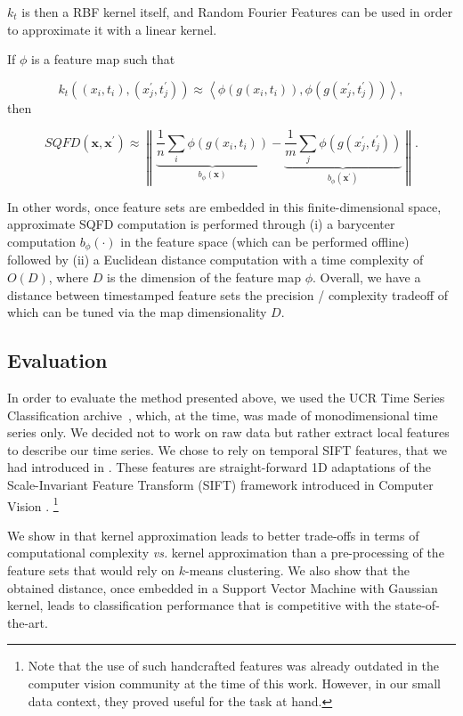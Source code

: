 $k_t$ is then a RBF kernel itself, and
Random Fourier Features \cite{NIPS2007_3182} can be
used in order to approximate it with a linear kernel.

If $\phi$ is a feature map such that

\begin{equation}
k_t((x_{i}, t_i), (x^\prime_j, t^\prime_j)) \approx
    \left\langle\phi(g(x_{i}, t_i)),
        \phi(g(x^\prime_{j}, t^\prime_j))\right\rangle,
\end{equation}
then

\begin{equation}
SQFD(\mathbf{x}, \mathbf{x}^\prime) \approx \left\|
    \underbrace{\frac{1}{n}\sum_i \phi(g(x_{i}, t_i))}_{b_\phi(\mathbf{x})} -
    \underbrace{\frac{1}{m}\sum_j
        \phi(g(x^\prime_{j}, t^\prime_j))}_{b_\phi(\mathbf{x}^\prime)}
    \right\|.
\end{equation}

In other words, once feature sets are embedded in this finite-dimensional
space, approximate SQFD computation is performed through (i) a barycenter
computation $b_\phi(\cdot)$ in the feature space (which can be performed
offline)
followed by (ii) a Euclidean distance computation with a time complexity of
$O(D)$, where $D$ is
the dimension of the feature map $\phi$.
Overall, we have a distance between timestamped feature sets
the precision / complexity tradeoff of which
can be tuned via the map dimensionality $D$.

\subsection{Evaluation}

In order to evaluate the method presented above, we used the UCR Time
Series Classification archive~\cite{ucr}, which, at the time, was made of
monodimensional
time series only.
We decided not to work on raw data but rather extract local features to
describe our time series.
We chose to rely on temporal SIFT features, that we had introduced in
\cite{bailly:halshs-01184900,bailly:hal-01252726}.
These features are straight-forward 1D adaptations of the Scale-Invariant
Feature Transform (SIFT) framework introduced in Computer Vision
\cite{Lowe:2004:DIF:993451.996342}.%
\footnote{Note that the use of such handcrafted features was already outdated in the
computer vision community at the time of this work.
However, in our small data context, they proved useful for the task at hand.}

We show in \cite{tavenard:halshs-01561461} that kernel approximation
leads to better trade-offs in terms of computational
complexity \emph{vs.} kernel approximation than a pre-processing of the feature sets
that would rely on $k$-means clustering.
We also show that the obtained distance, once embedded in a Support Vector
Machine with Gaussian kernel, leads to classification performance that is
competitive with the state-of-the-art.
